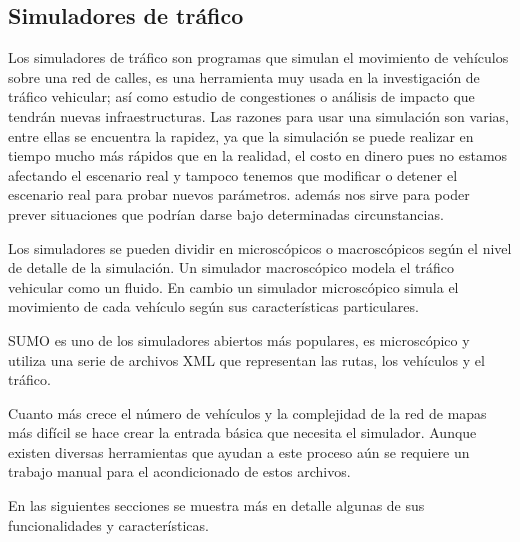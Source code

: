 \subsection{Simuladores de tráfico}
Los simuladores de tráfico son programas que simulan el movimiento de vehículos sobre una red de calles, es una herramienta muy usada en la investigación de tráfico vehicular; así como estudio de congestiones o análisis de impacto que tendrán nuevas infraestructuras.  Las razones para usar una simulación son varias, entre ellas se encuentra  la rapidez, ya que la simulación se puede realizar en tiempo mucho más rápidos que en la realidad, el costo en dinero pues no estamos afectando el escenario real  y tampoco tenemos que modificar o detener el escenario real para probar nuevos parámetros. además nos sirve para poder prever situaciones que podrían darse bajo determinadas circunstancias.

Los simuladores se pueden dividir en microscópicos o macroscópicos según el nivel de detalle de la simulación. Un simulador macroscópico modela  el tráfico vehicular como un fluido. En cambio un simulador microscópico simula el movimiento de cada vehículo según sus características particulares.

SUMO\citep{SUMO} es uno de los simuladores abiertos más populares, es microscópico y utiliza una serie de archivos  XML que representan las rutas, los vehículos y el tráfico.  

Cuanto más crece el número de vehículos y la complejidad de la red de mapas más difícil se hace crear la entrada básica que necesita el simulador. Aunque existen diversas herramientas que ayudan a este proceso aún se requiere un trabajo manual para el acondicionado de estos archivos.

En las siguientes secciones se muestra más en detalle algunas de sus funcionalidades y características.










